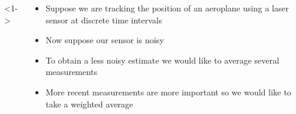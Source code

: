 \begin{frame}
\begin{columns}
        
        <1->
        \begin{overlayarea}{\textwidth}{\textheight}
            \begin{itemize}
                \justifying
                \item<1-> Suppose we are tracking the position of an aeroplane using a laser sensor at discrete time intervals
                \item<4-> Now suppose our sensor is noisy
                \item<5-> To obtain a less noisy estimate we would like to average several measurements
                \item<6-> More recent measurements are more important so we would like to take a weighted average
            \end{itemize}
        \end{overlayarea}
    \end{columns}
\end{frame}



